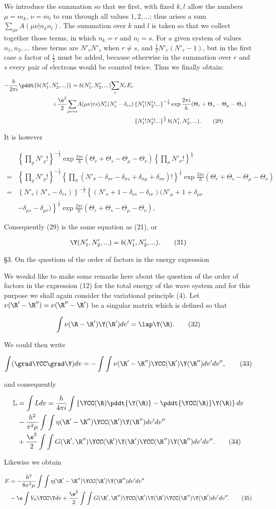 \documentclass{article}
\newcommand{\nequ}[2]{
\begin{align*}
#1
\tag{#2}
\end{align*}
}
\newcommand{\sumX}[1]{\underset{#1}{\sum}}
\begin{document}
We introduce the summation so that we first, with fixed $k,l$ allow the numbers $\mu = m_k$, $\nu = m_l$ to run through all values $1,2,...$; thus arises a sum $\sumX{\mu\nu}A(\mu\nu|n_k n_l)$. The summation over $k$ and $l$ is taken so that we collect together those terms, in which $n_k = r$ and $n_l = s$. For a given system of values $n_1,n_2,...$ these terms are $N'_r N'_s$ when $r \neq s$, and $\frac{1}{2}N'_r(N'_r - 1)$, but in the first case a factor of $\frac{1}{2}$ must be added, because otherwise in the summation over $r$ and $s$ every pair of electrons would be counted twice. Thus we finally obtain:
\nequ{
-\frac{h}{2\pi i} \pddt{b(N'_1,N'_2,...)} = b(N'_1,N'_2,...)\sumX{r}N_r E_r\\
+ \frac{\e^2}{2}\sumX{\mu\nu r s}A(\mu\nu|r s)N'_r(N'_s - \delta_{rs})
&\left\{{N'_1}!{N'_2}!...\right\}^{-\frac{1}{2}}
\exp{\frac{2\pi i}{h}(\Theta_r + \Theta_s - \Theta_\mu - \Theta_\nu)} \\
&\left\{{N'_1}!{N'_2}!...\right\}^{\frac{1}{2}}b(N'_1,N'_2,...).
}{29}
It is however
\nequ{
&\left\{\prod_\varrho N'_\varrho ! \right\}^{-\frac{1}{2}}
\exp{\frac{2\pi i}{h}(\Theta_r + \Theta_s - \Theta_\mu - \Theta_\nu)}
\left\{\prod_\sigma N'_\sigma ! \right\}^{\frac{1}{2}} \\
=& \left\{\prod_\varrho N'_\varrho ! \right\}^{-\frac{1}{2}}
\left\{
\prod_\sigma(N'_\sigma - \delta_{\sigma r} - \delta_{\sigma s} + \delta_{\sigma\mu} + \delta_{\sigma\nu})!
\right\}^\frac{1}{2}
\exp{\frac{2\pi i}{h}(\Theta_r + \Theta_s - \Theta_\mu - \Theta_\nu)} \\
=& \left\{N'_r(N'_s - \delta_{rs})\right\}^{-\frac{1}{2}}\left\{
(N'_\nu + 1 - \delta_{\nu s} - \delta_{\nu r})
(N'_\mu + 1 + \delta_{\mu\nu} \right. \\
& \left. - \delta_{\mu s} - \delta_{\mu r})
\right\}^{\frac{1}{2}}
\exp{\frac{2\pi i}{h}(\Theta_r + \Theta_s - \Theta_\mu - \Theta_\nu)},
}{30}
Consequently (29) is the same equation as (21), or
\nequ{
\Y(N'_1, N'_2, ...) = b(N'_1,N'_2,...).
}{31}

§3. On the questiom of the order of factors in the energy expression

We woukd like to make some remarks here about the question of the order of factors in the expression (12) for the total energy of the wave system and for this purpose we shall again consider the variational principle (4). Let $\nu(\R' - \R'') = \nu(\R'' - \R')$ be a singular matrix which is defined so that
\nequ{
\int\nu(\R - \R')\Y(\R')dv' = \lap\Y(\R).
}{32}
We could then write
\nequ{
\int(\grad\YCC\grad\Y)dv = -\int\int\nu(\R'-\R'')\YCC(\R')\Y(\R'')dv' dv'',
}{33}
and consequently
\nequ{
\mathbb{L} &= \int L dv = \frac{h}{4\pi i}\int\left\{
\YCC(\R)\pddt{\Y(\R)} - \pddt{\YCC(\R)}\Y(\R)
\right\}dv\\
&- \frac{h^2}{\pi^2\mu}\int\int\eta(\R'-\R'')\YCC(\R')\Y(\R'')dv' dv''\\
&+ \frac{\e^2}{2}\int\int G(\R',\R'')\YCC(\R')\Y(\R')\YCC(\R'')\Y(\R'')dv' dv''.
}{34}
Likewise we obtain
\nequ{
E &= -\frac{h^2}{8\pi^2\mu}\int\int\eta(\R'-\R'')\YCC(\R')\Y(\R'')dv' dv''\\
&- \e\int V_0\YCC\Y dv + \frac{\e^2}{2}\int\int G(\R',\R'')\YCC(\R')\Y(\R')\YCC(\R'')\Y(\R')dv' dv''.
}{35}
\end{document}
